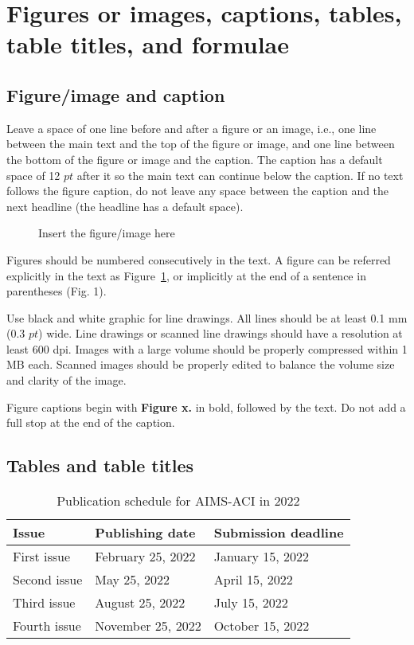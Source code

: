 \documentclass{aci}
\begin{document}
\section{Figures or images, captions, tables, table titles, and formulae}
\subsection{Figure/image and caption}
Leave a space of one line before and after a figure or an image, i.e., one line
between the main text and the top of the figure or image, and one line between
the bottom of the figure or image and the caption. The caption has a default
space of 12 $pt$ after it so the main text can continue below the caption. If no
text follows the figure caption, do not leave any space between the caption and
the next headline (the headline has a default space).

\begin{figure}[ht]
  \centering
  \vskip 0.2in
  \vspace {12pt}
  \caption{ Insert the figure/image here}
  \label{fig:res}
\end{figure}

Figures should be numbered consecutively in the text. A figure can be referred
explicitly in the text as Figure~\ref{fig:res}, or implicitly at the end of a
sentence in parentheses (Fig. 1).

Use black and white graphic for line drawings. All lines should be at least 0.1
mm (0.3 $pt$) wide. Line drawings or scanned line drawings should have a
resolution at least 600 dpi. Images with a large volume should be properly
compressed within 1 MB each. Scanned images should be properly edited to balance
the volume size and clarity of the image.

Figure captions begin with \textbf{Figure x.} in bold, followed by the text. Do
not add a full stop at the end of the caption.


\subsection{Tables and table titles}
\begin{table}[H]
  \begin{center}
    \caption{Publication schedule for AIMS-ACI in 2022}
    \begin{tabular}{lll} \hline
      Issue        & Publishing date   & Submission deadline \\\hline
      First issue  & February 25, 2022 & January 15, 2022    \\
      Second issue & May 25, 2022      & April 15, 2022      \\
      Third issue  & August 25, 2022   & July 15, 2022       \\
      Fourth issue & November 25, 2022 & October 15, 2022    \\\hline
    \end{tabular}
    \label{table}
  \end{center}
\end{table}
\end{document}
